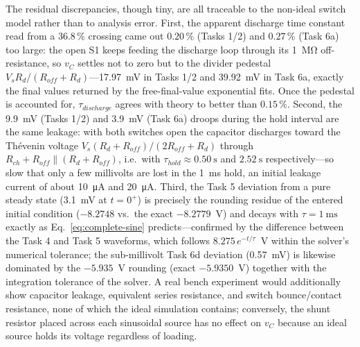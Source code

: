 \documentclass[12pt,a4paper]{article}
\begin{document}
	The residual discrepancies, though tiny, are all traceable to the
	non-ideal switch model rather than to analysis error.  First, the
	apparent discharge time constant read from a 36.8\,\% crossing came
	out $0.20\,\%$ (Tasks 1/2) and $0.27\,\%$ (Task 6a) too large: the
	open S1 keeps feeding the discharge loop through its
	\SI{1}{\mega\ohm} off-resistance, so $v_C$ settles not to zero but
	to the divider pedestal $V_s R_d/(R_{off}+R_d)$---\SI{17.97}{mV} in
	Tasks 1/2 and \SI{39.92}{mV} in Task 6a, exactly the final values
	returned by the free-final-value exponential fits.  Once the
	pedestal is accounted for, $\tau_{discharge}$ agrees with theory to
	better than $0.15\,\%$.  Second, the \SI{9.9}{\milli\volt}
	(Tasks 1/2) and \SI{3.9}{\milli\volt} (Task 6a) droops during the
	hold interval are the same leakage: with both switches open the
	capacitor discharges toward the Th\'evenin voltage
	$V_s(R_d + R_{off})/(2R_{off} + R_d)$ through
	$R_{ch} + R_{off} \parallel (R_d + R_{off})$, i.e.\ with
	$\tau_{hold} \approx \SI{0.50}{\second}$ and
	$\SI{2.52}{\second}$ respectively---so slow that only a few
	millivolts are lost in the \SI{1}{\milli\second} hold, an initial
	leakage current of about \SI{10}{\micro\ampere} and
	\SI{20}{\micro\ampere}.  Third, the Task 5 deviation from a pure
	steady state (\SI{3.1}{\milli\volt} at $t = 0^{+}$) is precisely the
	rounding residue of the entered initial condition ($-8.2748$ vs.\
	the exact $-8.2779$~V) and decays with $\tau =
	\SI{1}{\milli\second}$ exactly as Eq.~\eqref{eq:complete-sine}
	predicts---confirmed by the difference between the Task 4 and Task 5
	waveforms, which follows $8.275\,e^{-t/\tau}$~V within the solver's
	numerical tolerance; the sub-millivolt Task 6d deviation
	(\SI{0.57}{\milli\volt}) is likewise dominated by the $-5.935$~V
	rounding (exact $-5.9350$~V) together with the integration tolerance
	of the solver.  A real bench experiment would additionally show
	capacitor leakage, equivalent series resistance, and switch
	bounce/contact resistance, none of which the ideal simulation
	contains; conversely, the shunt resistor placed across each
	sinusoidal source has no effect on $v_C$ because an ideal source
	holds its voltage regardless of loading.
	
\end{document}

